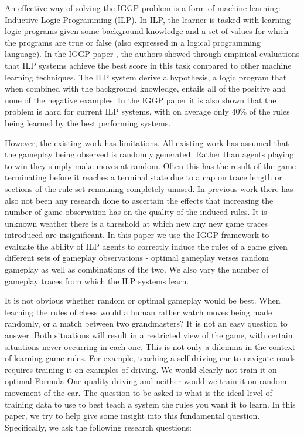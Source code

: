 An effective way of solving the IGGP problem is a form of machine learning: Inductive Logic Programming (ILP). In ILP, the learner is tasked with learning logic programs given some background knowledge and a set of values for which the programs are true or false (also expressed in a logical programming language). In the IGGP paper \cite{Cropper/IGGP}, the authors showed through empirical evaluations that ILP systems achieve the best score in this task compared to other machine learning techniques. The ILP system derive a hypothesis, a logic program that when combined with the background knowledge, entails all of the positive and none of the negative examples\cite{Muggleton/ILP}. In the IGGP paper\cite{Cropper/IGGP} it is also shown that the problem is hard for current ILP systems, with on average only 40\% of the rules being learned by the best performing systems.

However, the existing work has limitations. All existing work has assumed that the gameplay being observed is randomly generated. Rather than agents playing to win they simply make moves at random. Often this has the result of the game terminating before it reaches a terminal state due to a cap on trace length or sections of the rule set remaining completely unused. In previous work there has also not been any research done to ascertain the effects that increasing the number of game observation has on the quality of the induced rules. It is unknown weather there is a threshold at which new any new game traces introduced are insignificant. In this paper we use the IGGP framework to evaluate the ability of ILP agents to correctly induce the rules of a game given different sets of gameplay observations - optimal gameplay verses random gameplay as well as combinations of the two. We also vary the number of gameplay traces from which the ILP systems learn. 


It is not obvious whether random or optimal gameplay would be best. When learning the rules of chess would a human rather watch moves being made randomly, or a match between two grandmasters? It is not an easy question to answer. Both situations will result in a restricted view of the game, with certain situations never occurring in each one. This is not only a dilemma in the context of learning game rules. For example, teaching a self driving car to navigate roads requires training it on examples of driving. We would clearly not train it on optimal Formula One quality driving and neither would we train it on random movement of the car. The question to be asked is what is the ideal level of training data to use to best teach a system the rules you want it to learn. In this paper, we try to help give some insight into this fundamental question. Specifically, we ask the following research questions:

